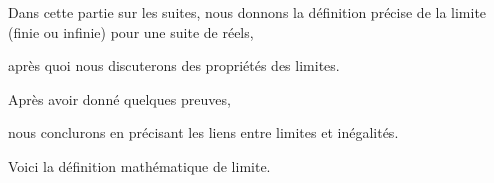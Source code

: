 







\debuttexte

\diapo

\change

\change

Dans cette partie sur les suites, nous donnons la définition 
précise de la limite (finie ou infinie) pour une suite de réels,

\change

après quoi nous discuterons des propriétés des limites.

\change

Après avoir donné quelques preuves, 

\change 

nous conclurons en précisant les liens entre limites et inégalités.

% 
% 
% 
% 
% 
% 
% 
%  
%  
%  
% 
%  
% 
% 
% 
%  
%  
%  
%  
%  
%  
%  
%  
% 
% 
% 
%  
%  

\diapo

Voici la définition mathématique de limite.

